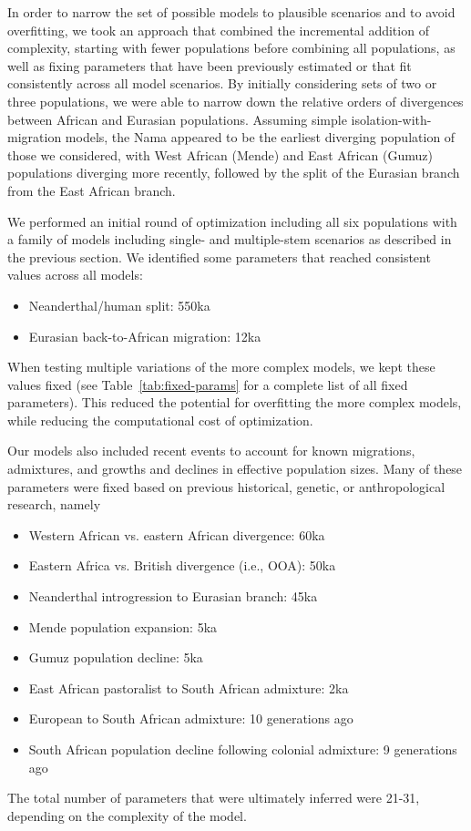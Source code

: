 \documentclass[]{article}
\begin{document}
In order to narrow the set of possible models to plausible scenarios and to
avoid overfitting, we took an approach that combined the incremental addition
of complexity, starting with fewer populations before combining all
populations, as well as fixing parameters that have been previously estimated
or that fit consistently across all model scenarios. By initially considering
sets of two or three populations, we were able to narrow down the relative
orders of divergences between African and Eurasian populations. Assuming simple
isolation-with-migration models, the Nama appeared to be the earliest diverging
population of those we considered, with West African (Mende) and East African
(Gumuz) populations diverging more recently, followed by the split of the
Eurasian branch from the East African branch.

We performed an initial round of optimization including all six populations
with a family of models including single- and multiple-stem scenarios as
described in the previous section. We identified some parameters that reached
consistent values across all models:
\begin{itemize}
    \item Neanderthal/human split: 550ka
    \item Eurasian back-to-African migration: 12ka
\end{itemize}
When testing multiple variations of the more complex models, we kept these
values fixed (see Table~\ref{tab:fixed-params} for a complete list of all fixed
parameters). This reduced the potential for overfitting the more complex
models, while reducing the computational cost of optimization.

Our models also included recent events to account for known migrations,
admixtures, and growths and declines in effective population sizes. Many of
these parameters were fixed based on previous historical, genetic, or
anthropological research, namely
\begin{itemize}
    \item Western African vs. eastern African divergence: 60ka
        \citep{Pagani2015-pz,Chevrier2018-vv,Niang2020-xt}
    \item Eastern Africa vs. British divergence (i.e., OOA): 50ka
        \citep{Mellars2011-sr,Fu2014-am,Hublin2020-nk}
    \item Neanderthal introgression to Eurasian branch: 45ka \citep{Reilly2022-ym}
    \item Mende population expansion: 5ka \citep{Tennessen2012-oy}
    \item Gumuz population decline: 5ka
    \item East African pastoralist to South African admixture: 2ka \citep{Henn2008-xo}
    \item European to South African admixture: 10 generations ago \citep{Uren2016-nn}
    \item South African population decline following colonial admixture: 9 generations ago \citep{Van_Eeden2022-od}
\end{itemize}
The total number of parameters that were ultimately inferred were 21-31, depending on the complexity
of the model.
\end{document}
